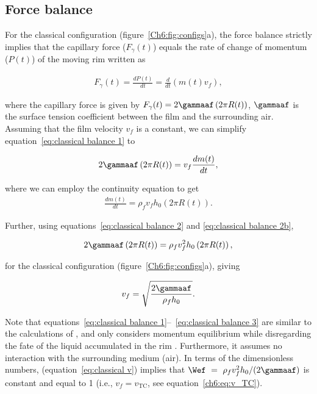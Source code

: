 \begin{subappendices}
	\subsection{Force balance}
	For the classical configuration (figure~\ref{Ch6:fig:configs}a), the force balance strictly implies that the capillary force ($F_{\gamma}(t)$) equals the rate of change of momentum ($P(t)$) of the moving rim written as \citep{taylor-1959-procrsoclonda}
	
	\begin{align}
		F_{\gamma}(t) = \frac{dP(t)}{dt} = \frac{d}{dt}\left(m(t)v_f\right),
		\label{eq:classical balance 1}
	\end{align}
	
	\noindent where the capillary force is given by $F_\gamma(t) = 2\gammaaf\left(2\pi R(t)\right)$, $\gammaaf$ is the surface tension coefficient between the film and the surrounding air. Assuming that the film velocity $v_f$ is a constant, we can simplify equation~\eqref{eq:classical balance 1} to
	
	\begin{align}
		2\gammaaf\left(2\pi R(t)\right) = v_f\frac{dm(t)}{dt},
		\label{eq:classical balance 2}
	\end{align}
	
	\noindent where we can employ the continuity equation to get
	\begin{align}
		\frac{dm(t)}{dt} = \rho_f v_f h_0\left(2\pi R(t)\right).
		\label{eq:classical balance 2b}
	\end{align}
	
	\noindent Further, using equations~\eqref{eq:classical balance 2} and \eqref{eq:classical balance 2b},
	
	\begin{align}
		2\gammaaf\left(2\pi R(t)\right) = \rho_fv_f^2h_0\left(2\pi R(t)\right),
		\label{eq:classical balance 3}
	\end{align}
	
	\noindent for the classical configuration (figure~\ref{Ch6:fig:configs}a), giving
	
	\begin{align}
		v_f = \sqrt{ \frac{2\gammaaf}{\rho_f h_0}}.
		\label{eq:classical v}
	\end{align}
	
	\noindent Note that equations~\eqref{eq:classical balance 1}--~\eqref{eq:classical balance 3} are similar to the calculations of \citet{taylor-1959-procrsoclonda}, and only considers momentum equilibrium while disregarding the fate of the liquid accumulated in the rim \citep{villermaux2020fragmentation}. Furthermore, it assumes no interaction with the surrounding medium (air). In terms of the dimensionless numbers, (equation~\eqref{eq:classical v}) implies that $\Wef~=~\rho_fv_f^2h_0/(2\gammaaf)$ is constant and equal to 1 (i.e., $v_f = v_{\text{TC}}$, see equation~\eqref{ch6:eq:v_TC}).
	

\end{subappendices}
